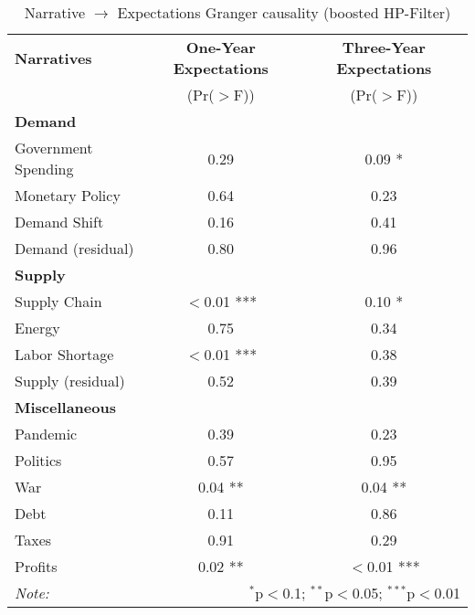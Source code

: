 \begin{table}[ht]
\centering
\caption{Narrative $\rightarrow$ Expectations Granger causality (boosted HP-Filter)}\label{tab:granger}

\begin{tabular}{lcc}
\toprule
\textbf{Narratives} & \textbf{One-Year Expectations} & \textbf{Three-Year Expectations} \\
& (Pr($>$F)) & (Pr($>$F)) \\
\midrule
\multicolumn{3}{l}{\textbf{Demand}} \\
\midrule
Government Spending & 0.29 & 0.09 * \\
Monetary Policy & 0.64 & 0.23 \\
Demand Shift & 0.16 & 0.41 \\
Demand (residual) & 0.80 & 0.96 \\
\midrule
\multicolumn{3}{l}{\textbf{Supply}} \\
\midrule
Supply Chain & $<$0.01 *** & 0.10 * \\
Energy & 0.75 & 0.34 \\
Labor Shortage & $<$0.01 *** & 0.38 \\
Supply (residual) & 0.52 & 0.39 \\
\midrule
\multicolumn{3}{l}{\textbf{Miscellaneous}} \\
\midrule
Pandemic & 0.39 & 0.23 \\
Politics & 0.57 & 0.95 \\
War & 0.04 ** & 0.04 ** \\
Debt & 0.11 & 0.86 \\
Taxes & 0.91 & 0.29 \\
Profits & 0.02 ** & $<$0.01 *** \\
\midrule
\bottomrule
\textit{Note:}  & \multicolumn{2}{r}{$^{*}$p$<$0.1; $^{**}$p$<$0.05; $^{***}$p$<$0.01} \\
\bottomrule
\end{tabular}
\end{table}
